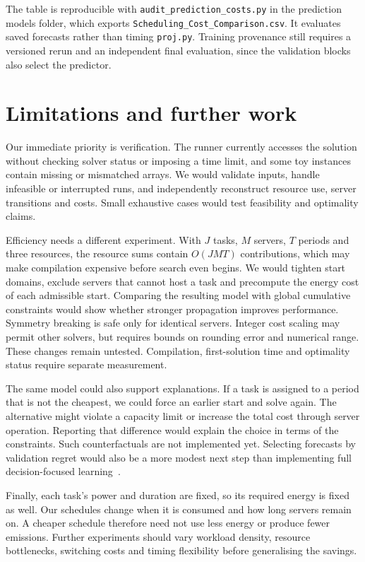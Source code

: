 \documentclass[10pt,a4paper,twocolumn]{article}
\newcommand{\code}[1]{\texttt{#1}}
\begin{document}
The table is reproducible with \code{audit\_prediction\_costs.py} in the prediction models folder, which exports \code{Scheduling\_Cost\_Comparison.csv}. It evaluates saved forecasts rather than timing \code{proj.py}. Training provenance still requires a versioned rerun and an independent final evaluation, since the validation blocks also select the predictor.

\section{Limitations and further work}
Our immediate priority is verification. The runner currently accesses the solution without checking solver status or imposing a time limit, and some toy instances contain missing or mismatched arrays. We would validate inputs, handle infeasible or interrupted runs, and independently reconstruct resource use, server transitions and costs. Small exhaustive cases would test feasibility and optimality claims.

Efficiency needs a different experiment. With $J$ tasks, $M$ servers, $T$ periods and three resources, the resource sums contain $O(JMT)$ contributions, which may make compilation expensive before search even begins. We would tighten start domains, exclude servers that cannot host a task and precompute the energy cost of each admissible start. Comparing the resulting model with global cumulative constraints would show whether stronger propagation improves performance. Symmetry breaking is safe only for identical servers. Integer cost scaling may permit other solvers, but requires bounds on rounding error and numerical range. These changes remain untested. Compilation, first-solution time and optimality status require separate measurement.

The same model could also support explanations. If a task is assigned to a period that is not the cheapest, we could force an earlier start and solve again. The alternative might violate a capacity limit or increase the total cost through server operation. Reporting that difference would explain the choice in terms of the constraints. Such counterfactuals are not implemented yet. Selecting forecasts by validation regret would also be a more modest next step than implementing full decision-focused learning~\cite{mandi}.

Finally, each task's power and duration are fixed, so its required energy is fixed as well. Our schedules change when it is consumed and how long servers remain on. A cheaper schedule therefore need not use less energy or produce fewer emissions. Further experiments should vary workload density, resource bottlenecks, switching costs and timing flexibility before generalising the savings.
\end{document}
